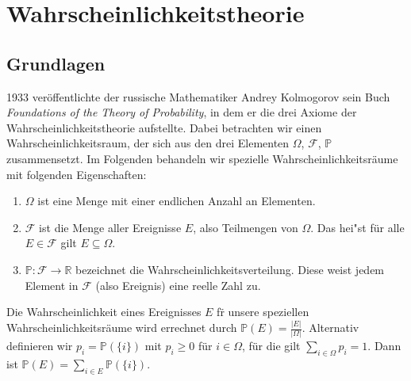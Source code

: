 \newcommand{\Var}{\operatorname{Var}}

\section{Wahrscheinlichkeitstheorie}

\subsection{Grundlagen}
1933 ver\"offentlichte der russische Mathematiker Andrey Kolmogorov sein Buch \textit{Foundations of the Theory of Probability}, in dem er die drei Axiome der Wahrscheinlichkeitstheorie aufstellte. Dabei betrachten wir einen Wahrscheinlichkeitsraum, der sich aus den drei Elementen $\Omega$, $\mathcal{F}$, $\mathbb{P}$ zusammensetzt. Im Folgenden behandeln wir spezielle Wahrscheinlichkeitsr\"aume mit folgenden Eigenschaften:

\begin{enumerate}
	\item $\Omega$ ist eine Menge mit einer endlichen Anzahl an Elementen.
	\item $\mathcal{F}$ ist die Menge aller Ereignisse $E$, also Teilmengen von $\Omega$. Das hei"st f\"ur alle $E \in \mathcal{F}$ gilt $E \subseteq \Omega$.
	\item $\mathbb{P}: \mathcal{F} \rightarrow \mathbb{R}$ bezeichnet die Wahrscheinlichkeitsverteilung. Diese weist jedem Element in $\mathcal{F}$ (also Ereignis) eine reelle Zahl zu.  
\end{enumerate}
\medskip

Die Wahrscheinlichkeit eines Ereignisses $E$ f\"r unsere speziellen Wahrscheinlichkeitsr\"aume wird errechnet durch $ \mathbb{P}(E) = \frac{|E|}{|\Omega|}$.
Alternativ definieren wir $p_{i} = \mathbb{P} (\{i\})$ mit $p_{i} \geq 0$  
f\"ur $i \in \Omega$, f\"ur die gilt $\sum_{i\in \Omega} p_{i} =1$. Dann ist $\mathbb{P}(E) = \sum_{i\in E} \mathbb{P}(\{i\})$. 


